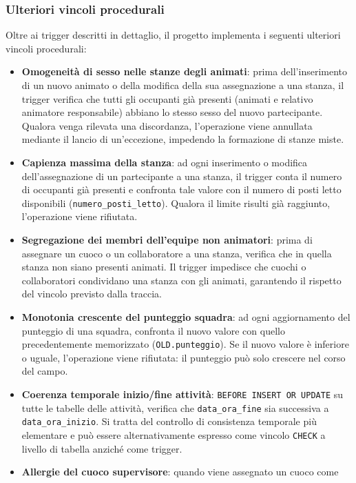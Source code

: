 \documentclass[11pt,a4paper]{article}
\begin{document}
\subsubsection{Ulteriori vincoli procedurali}

Oltre ai trigger descritti in dettaglio, il progetto implementa i seguenti ulteriori vincoli
procedurali:

\begin{itemize}[nosep]
  \item \textbf{Omogeneità di sesso nelle stanze degli animati}: prima dell'inserimento di un
    nuovo animato o della modifica della sua assegnazione a una stanza, il trigger verifica che
    tutti gli occupanti già presenti (animati e relativo animatore responsabile) abbiano lo
    stesso sesso del nuovo partecipante. Qualora venga rilevata una discordanza, l'operazione
    viene annullata mediante il lancio di un'eccezione, impedendo la formazione di stanze miste.
  \item \textbf{Capienza massima della stanza}: ad ogni inserimento o modifica dell'assegnazione
    di un partecipante a una stanza, il trigger conta il numero di occupanti già presenti e
    confronta tale valore con il numero di posti letto disponibili
    (\texttt{numero\_posti\_letto}). Qualora il limite risulti già raggiunto, l'operazione viene
    rifiutata.
  \item \textbf{Segregazione dei membri dell'equipe non animatori}: prima di assegnare un cuoco
    o un collaboratore a una stanza, verifica che in quella stanza non siano presenti animati.
    Il trigger impedisce che cuochi o collaboratori condividano una stanza con gli animati,
    garantendo il rispetto del vincolo previsto dalla traccia.
  \item \textbf{Monotonia crescente del punteggio squadra}: ad ogni aggiornamento del punteggio
    di una squadra, confronta il nuovo valore con quello precedentemente memorizzato
    (\texttt{OLD.punteggio}). Se il nuovo valore è inferiore o uguale, l'operazione viene
    rifiutata: il punteggio può solo crescere nel corso del campo.
  \item \textbf{Coerenza temporale inizio/fine attività}: \texttt{BEFORE INSERT OR UPDATE} su
    tutte le tabelle delle attività, verifica che \texttt{data\_ora\_fine} sia successiva a
    \texttt{data\_ora\_inizio}. Si tratta del controllo di consistenza temporale più elementare
    e può essere alternativamente espresso come vincolo \texttt{CHECK} a livello di tabella
    anziché come trigger.
  \item \textbf{Allergie del cuoco supervisore}: quando viene assegnato un cuoco come

\end{itemize}
\end{document}
